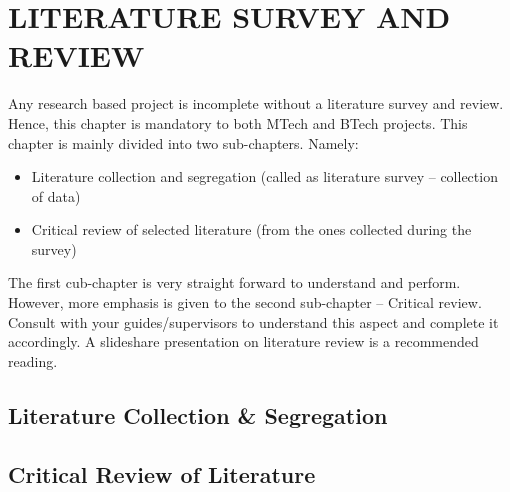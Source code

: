 
\chapter{LITERATURE SURVEY AND REVIEW} %
\label{ChapterLiteratureSurvey} %

Any research based project is incomplete without a literature survey and review. Hence, this chapter is mandatory to both MTech and BTech projects. This chapter is mainly divided into two sub-chapters. Namely:
\begin{itemize}
	\item Literature collection and segregation (called as literature survey – collection of data)
	\item Critical review of selected literature (from the ones collected during the survey)	
\end{itemize}

The first cub-chapter is very straight forward to understand and perform. However, more emphasis is given to the second sub-chapter – Critical review. Consult with your guides/supervisors to understand this aspect and complete it accordingly. A slideshare presentation on literature review is a recommended reading. 

\section{Literature Collection \& Segregation}


\section{Critical Review of Literature}

